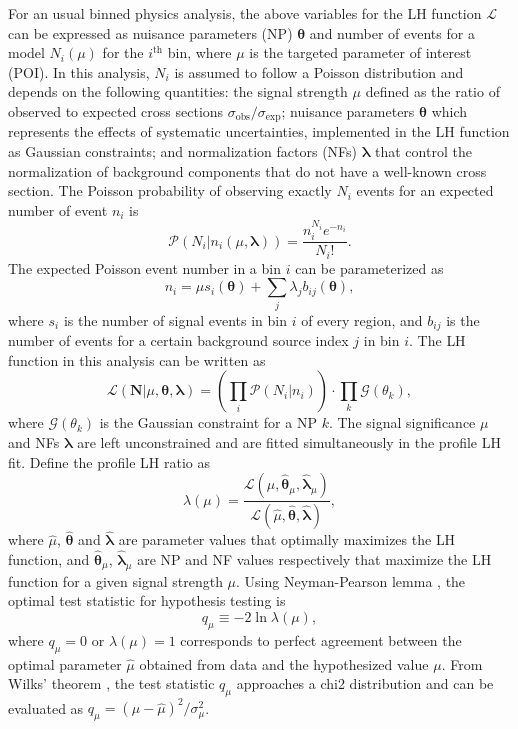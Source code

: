 \documentclass[../thesis.tex]{subfiles}
\begin{document}
For an usual binned physics analysis, the above variables for the \acs{LH} function $\mathcal{L}$ can be expressed as nuisance parameters (\acs{NP}) $\bm{\theta}$ and number of events for a model $N_i(\mu)$ for the $i^\text{th}$ bin, where $\mu$ is the targeted parameter of interest (\acs{POI}). In this analysis, $N_i$ is assumed to follow a Poisson distribution and depends on the following quantities: the signal strength $\mu$ defined as the ratio of observed to expected cross sections $\sigma_\text{obs}/\sigma_\text{exp}$; nuisance parameters $\bm{\theta}$ which represents the effects of systematic uncertainties, implemented in the \acs{LH} function as Gaussian constraints; and normalization factors (\acs{NF}s) $\bm{\lambda}$ that control the normalization of background components that do not have a well-known cross section. The Poisson probability of observing exactly $N_i$ events for an expected number of event $n_i$ is
\begin{equation}
\mathcal{P}(N_i | n_i(\mu,\bm{\lambda})) = \frac{n_i^{N_i}e^{-n_i}}{N_i!}.
\end{equation}
The expected Poisson event number in a bin $i$ can be parameterized as
\begin{equation}
\label{eq:poisson}
n_i = \mu s_i(\bm{\theta}) + \sum_j \lambda_j b_{ij}(\bm{\theta}),
\end{equation}
where $s_i$ is the number of signal events in bin $i$ of every region, and $b_{ij}$ is the number of events for a certain background source index $j$ in bin $i$. The \acs{LH} function in this analysis can be written as
\begin{equation}
\mathcal{L}(\mathbf{N}|\mu,\bm{\theta},\bm{\lambda})=\left(
\displaystyle\prod_i \mathcal{P}(N_i | n_i)
\right)\cdot\displaystyle\prod_k\mathcal{G}(\theta_k),
\end{equation}
where $\mathcal{G}(\theta_k)$ is the Gaussian constraint for a \acs{NP} $k$. The signal significance $\mu$ and \acs{NF}s $\bm{\lambda}$ are left unconstrained and are fitted simultaneously in the profile \acs{LH} fit. Define the profile \acs{LH} ratio \citep{profile_llh} as
\begin{equation}
\lambda(\mu) = \frac{\mathcal{L}(\mu,\hat{\bm{\theta}}_\mu,\hat{\bm{\lambda}}_\mu)}{\mathcal{L}(\hat{\mu},\hat{\bm{\theta}},\hat{\bm{\lambda}})},
\end{equation}
where $\hat{\mu}$, $\hat{\bm{\theta}}$ and $\hat{\bm{\lambda}}$ are parameter values that optimally maximizes the \acs{LH} function, and $\hat{\bm{\theta}}_\mu$, $\hat{\bm{\lambda}}_\mu$ are \acs{NP} and \acs{NF} values respectively that maximize the \acs{LH} function for a given signal strength $\mu$. Using Neyman-Pearson lemma \citep{neyman_pearson}, the optimal test statistic for hypothesis testing is
\begin{equation}
q_\mu \equiv -2 \ln \lambda(\mu),
\end{equation}
where $q_\mu=0$ or $\lambda(\mu)=1$ corresponds to perfect agreement between the optimal parameter $\hat{\mu}$ obtained from data and the hypothesized value $\mu$. From Wilks' theorem \citep{wilks_theorem}, the test statistic $q_\mu$ approaches a \acs{chi2} distribution and can be evaluated as $q_\mu = (\mu-\hat{\mu})^2/\sigma_\mu^2$.
\end{document}

